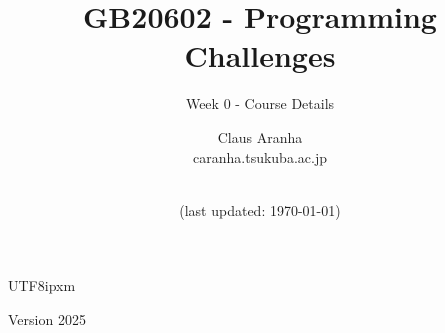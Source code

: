 \documentclass[aspectratio=169]{beamer}
\title[Programming Challenges]{GB20602 - Programming Challenges}
\subtitle[Week 0]{Week 0 - Course Details}
\author[Claus Aranha]{Claus Aranha\\{\footnotesize caranha\@@cs.tsukuba.ac.jp}}
\institute[]{College of Information Sciences}
\date[]{\\{\smaller(last updated: \today)}}
\begin{document}
\begin{CJK}{UTF8}{ipxm}

\begin{frame}
\maketitle
\vfill

\hfill Version 2025
\end{frame}





\end{CJK}
\end{document}
